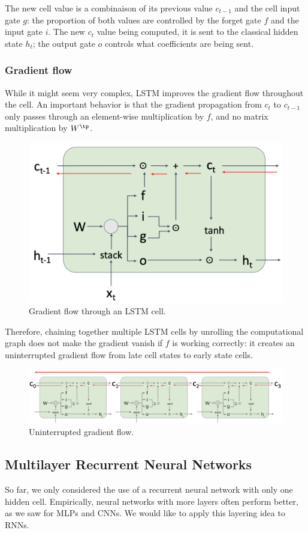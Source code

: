 The new cell value is a combinaison of its previous value $c_{t-1}$ and the cell input gate $g$: the proportion of both values are controlled by the forget gate $f$ and the input gate $i$. The new $c_t$ value being computed, it is sent to the classical hidden state $h_t$; the output gate $o$ controls what coefficients are being sent.

\subsubsection{Gradient flow}
While it might seem very complex, LSTM improves the gradient flow throughout the cell. An important behavior is that the gradient propagation from $c_t$ to $c_{t-1}$ only passes through an element-wise multiplication by $f$, and no matrix multiplication by $W^\tp$.
\begin{figure}[H]
    \centering
    \includegraphics[width=.5\textwidth]{images/lstm-flow.png}
    \caption{Gradient flow through an LSTM cell.}
\end{figure}

Therefore, chaining together multiple LSTM cells by unrolling the computational graph does not make the gradient vanish if $f$ is working correctly: it creates an uninterrupted gradient flow from late cell states to early state cells.
\begin{figure}[H]
    \centering
    \includegraphics[width=\textwidth]{images/lstm-uninterrupted-grad.png}
    \caption{Uninterrupted gradient flow.}
\end{figure}

\subsection{Multilayer Recurrent Neural Networks}
So far, we only considered the use of a recurrent neural network with only one hidden cell. Empirically, neural networks with more layers often perform better, as we saw for MLPs and CNNs. We would like to apply this layering idea to RNNs.

